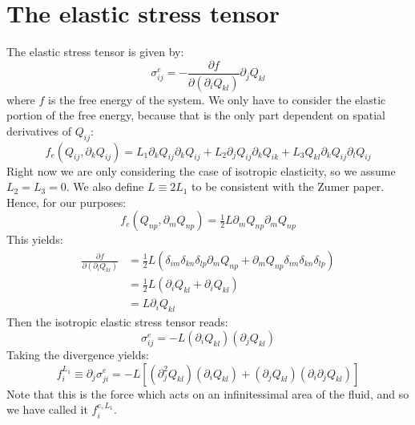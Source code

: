 \documentclass[reqno]{article}
\begin{document}
\section{The elastic stress tensor}
The elastic stress tensor is given by:
\begin{equation}
	\sigma^e_{ij}
	= - \frac{\partial f}{\partial \left(\partial_i Q_{kl}\right)}
	\partial_j Q_{kl}
\end{equation}
where $f$ is the free energy of the system.
We only have to consider the elastic portion of the free energy, because that is the only part dependent on spatial derivatives of $Q_{ij}$:
\begin{equation}
	f_e	\left(Q_{ij}, \partial_k Q_{ij}\right)
	= L_1 \partial_k Q_{ij} \partial_k Q_{ij}
	+ L_2 \partial_j Q_{ij} \partial_k Q_{ik}
	+ L_3 Q_{kl} \partial_k Q_{ij} \partial_l Q_{ij}
\end{equation}
Right now we are only considering the case of isotropic elasticity, so we assume $L_2 = L_3 = 0$. 
We also define $L \equiv 2 L_1$ to be consistent with the Zumer paper.
Hence, for our purposes:
\begin{equation}
	f_e	\left(Q_{np}, \partial_m Q_{np}\right)
	= \tfrac12 L \partial_m Q_{np} \partial_m Q_{np}
\end{equation}
This yields:
\begin{equation}
\begin{split}
	\frac{\partial f}{\partial \left(\partial_i Q_{kl}\right)}
	&= \tfrac12 L \left(
	\delta_{im} \delta_{kn} \delta_{lp} \partial_m Q_{np}
	+ \partial_m Q_{np} \delta_{im} \delta_{kn} \delta_{lp}
	\right) \\
	&= \tfrac12 L \left(
	\partial_i Q_{kl} + \partial_i Q_{kl}
	\right) \\
	&= L \partial_i Q_{kl}
\end{split}
\end{equation}
Then the isotropic elastic stress tensor reads:
\begin{equation}
	\sigma^e_{ij}
	= - L \left( \partial_i Q_{kl} \right) \left( \partial_j Q_{kl} \right)
\end{equation}
Taking the divergence yields:
\begin{equation}
	f^{L_1}_i \equiv \partial_j \sigma^e_{ji}
	= - L \left[ \left( \partial_j^2 Q_{kl} \right) 
	\left( \partial_i Q_{kl} \right)
	+ \left(\partial_j Q_{kl} \right) 
	\left( \partial_i \partial_j Q_{kl} \right)
	\right]
\end{equation}
Note that this is the force which acts on an infinitessimal area of the fluid, and so we have called it $f^{e, L_1}_i$.
\end{document}
